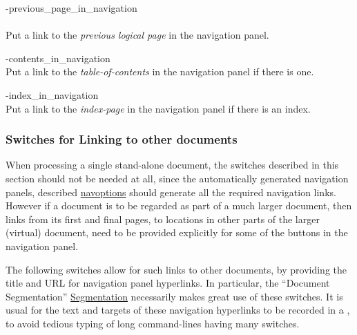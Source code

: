 \begin{htmllist}
%
\item [ -previous\_page\_in\_navigation\label{previnnavig}]~\\%
\\
Put a link to the \textsl{previous logical page} in the navigation panel.

\item [ -contents\_in\_navigation\label{continnavig}]
\\
Put a link to the \textsl{table-of-contents} in the navigation panel if there is one.

\item [ -index\_in\_navigation\label{indexinnavig}]
\\
Put a link to the \textsl{index-page} in the navigation panel if there is an index.
%
\end{htmllist}


\subsubsection{Switches for Linking to other documents\label{otherdocs}}
%
When processing a single stand-alone document, the switches described in this
section should not be needed at all, since the automatically generated navigation panels, 
described \hyperref{on the previous page}{in Section~}{, }{navoptions}
should generate all the required navigation links.
However if a document is to be regarded as part of a much larger document,
then links from its first and final pages, to locations in other parts
of the larger (virtual) document, 
need to be provided explicitly for some of the buttons in the navigation panel.

The following switches allow for such links to other documents,
by providing the title and URL for navigation panel hyperlinks.
In particular, the ``Document Segmentation''
\hyperref{feature}{feature of Section~}{}{Segmentation} 
necessarily makes great use of these switches.
It is usual for the text and targets of these navigation hyperlinks
to be recorded in a , 
to avoid tedious typing of long command-lines having many switches.

